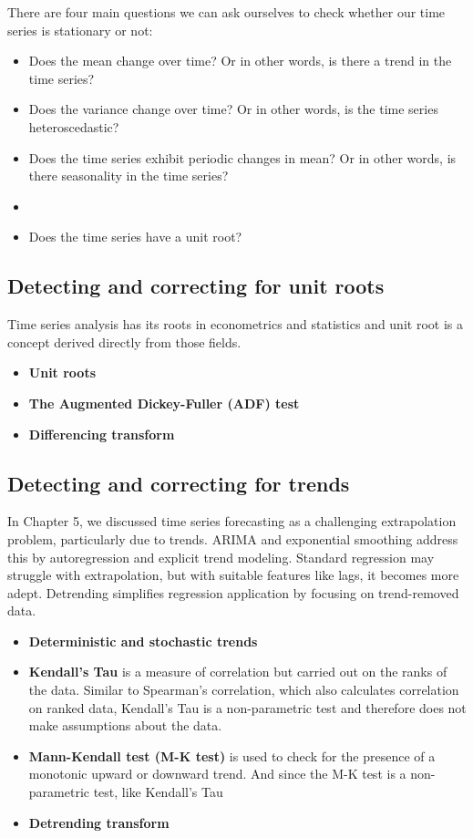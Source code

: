 \documentclass{article}
\begin{document}
There are four main questions we can ask ourselves to check whether our time series is stationary or not:
\begin{itemize}
    \item Does the mean change over time? Or in other words, is there a trend in the time series?
    \item Does the variance change over time? Or in other words, is the time series heteroscedastic?
    \item   Does the time series exhibit periodic changes in mean? Or in other words, is there seasonality in the time series?
    \item     
    \item Does the time series have a unit root?
\end{itemize}

\subsection{Detecting and correcting for unit roots}
Time series analysis has its roots in econometrics and statistics and unit root is a concept derived directly from those fields.

\begin{itemize}
    \item \textbf{Unit roots}
    \item \textbf{The Augmented Dickey-Fuller (ADF) test}
    \item \textbf{Differencing transform}
\end{itemize}


\subsection{Detecting and correcting for trends}
In Chapter 5, we discussed time series forecasting as a challenging extrapolation problem, particularly due to trends. ARIMA and exponential smoothing address this by autoregression and explicit trend modeling. Standard regression may struggle with extrapolation, but with suitable features like lags, it becomes more adept. Detrending simplifies regression application by focusing on trend-removed data.
\begin{itemize}
    \item \textbf{Deterministic and stochastic trends}
    \item \textbf{Kendall’s Tau} is a measure of correlation but carried out on the ranks of the data. Similar to Spearman’s correlation, which also calculates correlation on ranked data, Kendall’s Tau is a non-parametric test and therefore does not make assumptions about the data. 
    \item \textbf{Mann-Kendall test (M-K test)} is used to check for the presence of a monotonic upward or downward trend. And since the M-K test is a non-parametric test, like Kendall’s Tau
    \item \textbf{Detrending transform}
\end{itemize}
\end{document}
